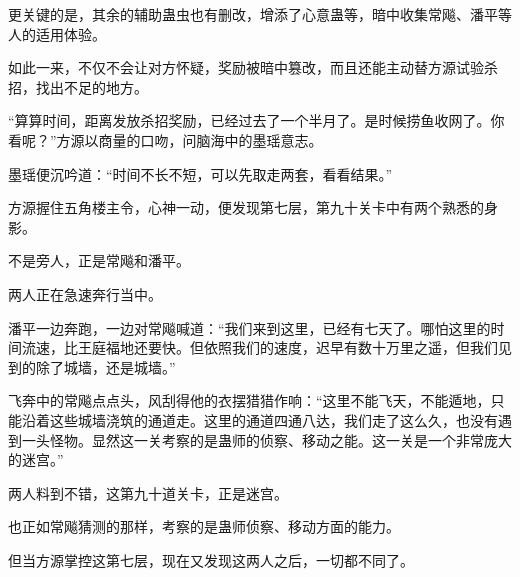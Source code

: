 \begin{this_body}
更关键的是，其余的辅助蛊虫也有删改，增添了心意蛊等，暗中收集常飚、潘平等人的适用体验。

如此一来，不仅不会让对方怀疑，奖励被暗中篡改，而且还能主动替方源试验杀招，找出不足的地方。

“算算时间，距离发放杀招奖励，已经过去了一个半月了。是时候捞鱼收网了。你看呢？”方源以商量的口吻，问脑海中的墨瑶意志。

墨瑶便沉吟道：“时间不长不短，可以先取走两套，看看结果。”

方源握住五角楼主令，心神一动，便发现第七层，第九十关卡中有两个熟悉的身影。

不是旁人，正是常飚和潘平。

两人正在急速奔行当中。

潘平一边奔跑，一边对常飚喊道：“我们来到这里，已经有七天了。哪怕这里的时间流速，比王庭福地还要快。但依照我们的速度，迟早有数十万里之遥，但我们见到的除了城墙，还是城墙。”

飞奔中的常飚点点头，风刮得他的衣摆猎猎作响：“这里不能飞天，不能遁地，只能沿着这些城墙浇筑的通道走。这里的通道四通八达，我们走了这么久，也没有遇到一头怪物。显然这一关考察的是蛊师的侦察、移动之能。这一关是一个非常庞大的迷宫。”

两人料到不错，这第九十道关卡，正是迷宫。

也正如常飚猜测的那样，考察的是蛊师侦察、移动方面的能力。

但当方源掌控这第七层，现在又发现这两人之后，一切都不同了。

\end{this_body}

